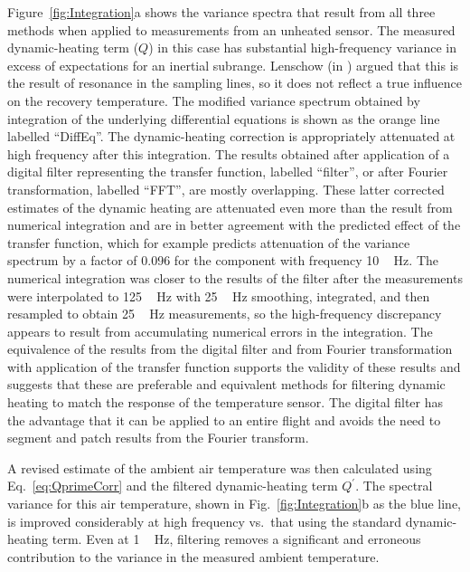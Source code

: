 \documentclass[amt, manuscript]{copernicus}
\begin{document}
Figure~\ref{fig:Integration}a shows the variance spectra that result
from all three methods when applied to measurements from an unheated
sensor. The measured dynamic-heating term (\(Q\)) in this case has
substantial high-frequency variance in excess of expectations for an
inertial subrange. Lenschow (in \citet{cooper2016ncartn}) argued that
this is the result of resonance in the sampling lines, so it does not
reflect a true influence on the recovery temperature. The modified
variance spectrum obtained by integration of the underlying differential
equations is shown as the orange line labelled ``DiffEq''. The
dynamic-heating correction is appropriately attenuated at high frequency
after this integration. The results obtained after application of a
digital filter representing the transfer function, labelled ``filter'',
or after Fourier transformation, labelled ``FFT'', are mostly
overlapping. These latter corrected estimates of the dynamic heating are
attenuated even more than the result from numerical integration and are
in better agreement with the predicted effect of the transfer function,
which for example predicts attenuation of the variance spectrum by a
factor of 0.096 for the component with frequency \unit{10\,Hz}. The
numerical integration was closer to the results of the filter after the
measurements were interpolated to \unit{125\,Hz} with \unit{25\,Hz}
smoothing, integrated, and then resampled to obtain \unit{25\,Hz}
measurements, so the high-frequency discrepancy appears to result from
accumulating numerical errors in the integration. The equivalence of the
results from the digital filter and from Fourier transformation with
application of the transfer function supports the validity of these
results and suggests that these are preferable and equivalent methods
for filtering dynamic heating to match the response of the temperature
sensor. The digital filter has the advantage that it can be applied to
an entire flight and avoids the need to segment and patch results from
the Fourier transform.

A revised estimate of the ambient air temperature was then calculated
using Eq.~\eqref{eq:QprimeCorr} and the filtered dynamic-heating term
\(Q^{\prime}\). The spectral variance for this air temperature, shown in
Fig.~\ref{fig:Integration}b as the blue line, is improved considerably
at high frequency vs.~that using the standard dynamic-heating term. Even
at \unit{1\,Hz}, filtering removes a significant and erroneous
contribution to the variance in the measured ambient temperature.
\end{document}
